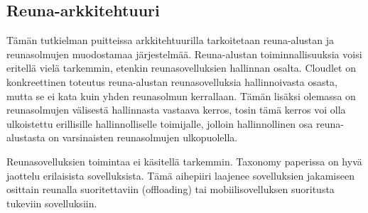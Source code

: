 

\subsection{Reuna-arkkitehtuuri}
Tämän tutkielman puitteissa arkkitehtuurilla tarkoitetaan reuna-alustan ja reunasolmujen muodostamaa järjestelmää. Reuna-alustan toiminnallisuuksia voisi eritellä vielä tarkemmin, etenkin reunasovelluksien hallinnan osalta. Cloudlet on konkreettinen toteutus reuna-alustan reunasovelluksia hallinnoivasta osasta, mutta se ei kata kuin yhden reunasolmun kerrallaan. Tämän lisäksi olemassa on reunasolmujen välisestä hallinnasta vastaava kerros, tosin tämä kerros voi olla ulkoistettu erillisille hallinnolliselle toimijalle, jolloin hallinnollinen osa reuna-alustasta on varsinaisten reunasolmujen ulkopuolella. 

Reunasovelluksien toimintaa ei käsitellä tarkemmin. Taxonomy paperissa on hyvä jaottelu erilaisista sovelluksista. Tämä aihepiiri laajenee sovelluksien jakamiseen osittain reunalla suoritettaviin (offloading) tai mobiilisovelluksen suoritusta tukeviin sovelluksiin. 


